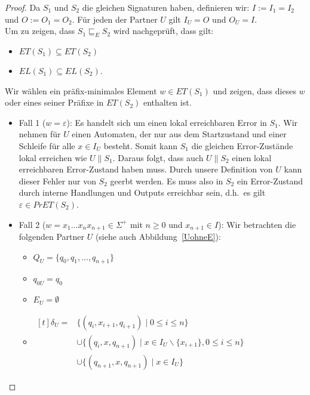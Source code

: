 \begin{proof}
  Da $S_1$ und $S_2$ die gleichen Signaturen haben, definieren wir:
  $I:=I_1=I_2$ und $O:=O_1=O_2$. Für jeden der Partner $U$ gilt $I_U=O$ und
  $O_U=I$.\\
  Um zu zeigen, dass $S_1\sqsubseteq _E S_2$ wird nachgeprüft, dass gilt:
  \begin{itemize}
    \item $ET(S_1)\subseteq ET(S_2)$
    \item $EL(S_1)\subseteq EL(S_2)$.
  \end{itemize}
  Wir wählen ein präfix-minimales Element $w\in ET(S_1)$ und
  zeigen, dass dieses $w$ oder eines seiner Präfixe in $ET(S_2)$ enthalten ist.
  \begin{itemize}
    \item Fall 1 ($w=\varepsilon$): Es handelt sich um einen lokal erreichbaren
      Error in $S_1$.
      Wir nehmen für $U$ einen Automaten, der nur aus dem Startzustand und
      einer Schleife für alle $x\in I_U$ besteht. Somit kann $S_1$ die gleichen
      Error-Zustände lokal erreichen wie $U\|S_1$. Daraus folgt, dass auch
      $U\|S_2$ einen lokal erreichbaren Error-Zustand haben muss. Durch unsere
      Definition von $U$ kann dieser Fehler nur von $S_2$ geerbt werden. Es
      muss also in $S_2$ ein Error-Zustand durch interne Handlungen und Outputs
      erreichbar sein, d.h.\ es gilt $\varepsilon\in PrET(S_2)$.
    \item Fall 2 ($w=x_1\dots x_n x_{n+1}\in\Sigma ^+$ mit $n\geq 0$ und
      $x_{n+1}\in I$): Wir betrachten die folgenden Partner $U$ (siehe auch
      Abbildung~\ref{UohneE}):
      \begin{itemize}
        \item $Q_U=\{q_0,q_1,\dots ,q_{n+1}\}$
        \item $q_{0U}=q_0$
        \item $E_U=\emptyset$
        \item $\begin{aligned}[t]
            \delta _U=&\{(q_i,x_{i+1},q_{i+1})\mid  0\leq i\leq n\}\\
                      &\cup\{(q_i,x,q_{n+1})\mid  x\in I_U\backslash\{x_{i+1}\},
          0\leq i\leq n\}\\
          &\cup\{(q_{n+1},x,q_{n+1})\mid  x\in I_U\}
        \end{aligned}$
      \end{itemize}
      \begin{figure} [h!tbp]
      \begin{center}
        \begin{tikzpicture}[->, >=latex',auto,node distance =3cm, semithick]


\end{tikzpicture}
\end{center}
\end{figure}
\end{itemize}
\end{proof}
